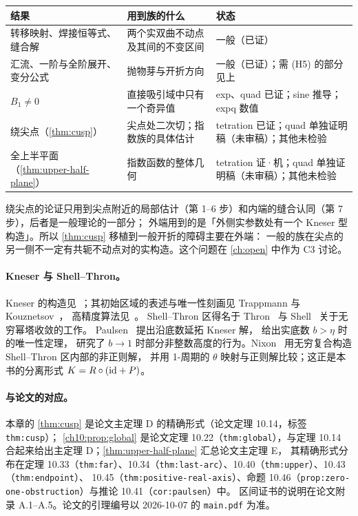 \begin{center}\small
\begin{tabular}{p{4.2cm}p{4.6cm}p{4.2cm}}
\toprule
结果 & 用到族的什么 & 状态\\
\midrule
转移映射、焊接恒等式、缝合解 & 两个实双曲不动点及其间的不变区间 & 一般（已证）\\
汇流、一阶与全阶展开、变分公式 & 抛物芽与开折方向 & 一般（已证）；需 (H5) 的部分见上\\
$B_1\neq0$ & 直接吸引域中只有一个奇异值 & exp、quad 已证；sine 推导；expq 数值\\
绕尖点（\cref{thm:cusp}） & 尖点处二次切；指数族的具体估计 & tetration 已证；quad 单独证明稿（未审稿）；其他未检验\\
全上半平面（\cref{thm:upper-half-plane}） & 指数函数的整体几何 & tetration 证·机；quad 单独证明稿（未审稿）；其他未检验\\
\bottomrule
\end{tabular}
\end{center}
绕尖点的论证只用到尖点附近的局部估计（第 1--6 步）和内端的缝合认同（第 7 步），后者是一般理论的一部分；
外端用到的是「外侧实参数处有一个 Kneser 型构造」。所以 \cref{thm:cusp} 移植到一般开折的障碍主要在外端：
一般的族在尖点的另一侧不一定有共轭不动点对的实构造。这个问题在 \cref{ch:open} 中作为 C3 讨论。

\notes

\paragraph{Kneser 与 Shell--Thron。}Kneser 的构造见~\cite{Kneser1950}；其初始区域的表述与唯一性刻画见 Trappmann 与 Kouznetsov~\cite{TrappmannKouznetsov2011}，
高精度算法见~\cite{Kouznetsov2009,KouznetsovTrappmann2010,KouznetsovTrappmann2012}。
Shell--Thron 区得名于 Thron~\cite{Thron1957} 与 Shell~\cite{Shell1962} 关于无穷幂塔收敛的工作。
Paulsen~\cite{Paulsen2019} 提出沿底数延拓 Kneser 解，\cite{PaulsenCowgill2017} 给出实底数 $b>\eta$ 时的唯一性定理，
\cite{Paulsen2026} 研究了 $b\to1$ 时部分非整数高度的行为。Nixon~\cite{Nixon2022} 用无穷复合构造 Shell--Thron 区内部的非正则解，
并用 1-周期的 $\theta$ 映射与正则解比较；这正是本书的分离形式 $K=R\circ(\mathrm{id}+P)$。

\paragraph{与论文的对应。}本章的 \cref{thm:cusp} 是论文主定理 D 的精确形式（论文定理 10.14，标签 \texttt{thm:cusp}）；
\cref{ch10:prop:global} 是论文定理 10.22（\texttt{thm:global}），与定理 10.14 合起来给出主定理 D；\cref{thm:upper-half-plane} 汇总论文主定理 E，
其精确形式分布在定理 10.33（\texttt{thm:far}）、10.34（\texttt{thm:last-arc}）、10.40（\texttt{thm:upper}）、10.43（\texttt{thm:endpoint}）、
10.45（\texttt{thm:positive-real-axis}）、命题 10.46（\texttt{prop:zero-one-obstruction}）与推论 10.41（\texttt{cor:paulsen}）中。
区间证书的说明在论文附录 A.1--A.5。论文的引理编号以 2026-10-07 的 \texttt{main.pdf} 为准。


